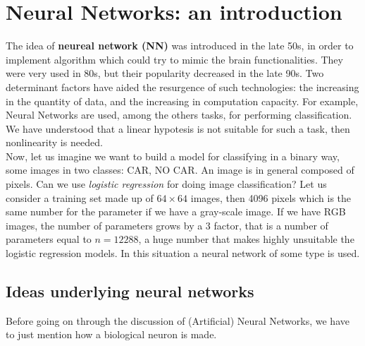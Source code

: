 \chapter{Neural Networks: an introduction}
The idea of \textbf{neureal network (NN)} was introduced in the late 50s, in order to implement algorithm which could try to mimic the brain functionalities. They were very used in 80s, but their popularity decreased in the late 90s. Two determinant factors have aided the resurgence of such  technologies: the increasing in the quantity of data, and the increasing in computation capacity. For example, Neural Networks are used, among the others tasks, for performing classification.
We have understood that a linear hypotesis is not suitable for such a task, then nonlinearity is needed.\\
Now, let us imagine we want to build a model for classifying in a binary way, some images in two classes: CAR, NO CAR. An image is in general composed of pixels. Can we use \textit{logistic regression} for doing image classification? Let us consider a training set made up of $64\times{64}$ images, then 4096 pixels which is the same number for the parameter if we have a gray-scale image. If we have RGB images, the number of parameters grows by a $3$ factor, that is a number of parameters equal to $n=12288$, a huge number that makes highly unsuitable the logistic regression models. In this situation a neural network of some type is used.

\section{Ideas underlying neural networks}
Before going on through the discussion of (Artificial) Neural Networks, we have to just mention how a biological neuron is made.

